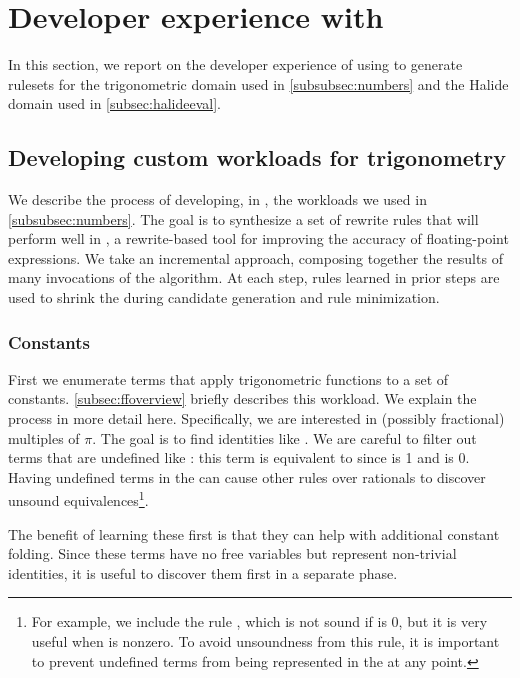 \section{Developer experience with \enumo}
\label{sec:devexp}

In this section, we report on the developer experience of using
  \enumo to generate rulesets for the trigonometric domain used in \autoref{subsubsec:numbers}
  and the Halide domain used in \autoref{subsec:halideeval}.

\subsection{Developing custom workloads for trigonometry}
\label{subsec:trigexperience}

We describe the process of developing, in \enumo, the workloads
  we used in \autoref{subsubsec:numbers}.
The goal is to synthesize a set of rewrite rules that will perform well in
  \herbie, a rewrite-based tool for improving the accuracy of floating-point expressions.
We take an incremental approach, composing together the results of many
  invocations of the \ff algorithm.
At each step, rules learned in prior steps are used to shrink the \egraph
  during candidate generation and rule minimization.

\subsubsection{Constants}
First we enumerate terms that apply
 trigonometric functions to a set of constants.
\autoref{subsec:ffoverview} briefly describes this workload.
We explain the process in more detail here.
Specifically, we are interested in (possibly fractional) multiples of $\pi$.
The goal is to find identities like
  .
We are careful to filter out terms that are undefined like
  : this term is equivalent to  since
   is 1 and  is 0.
Having undefined terms in the \egraph can cause other rules
  over rationals to discover unsound equivalences\footnote{For example,
  we include the rule , which is not sound if
   is 0, but it is very useful when  is nonzero. To avoid
  unsoundness from this rule, it is important to prevent undefined
  terms from being represented in the \egraph at any point.}.

The benefit of learning these first is that they can help with additional
  constant folding.
Since these terms have no free variables
  but represent non-trivial identities,
  it is useful to discover them first in a separate phase.

